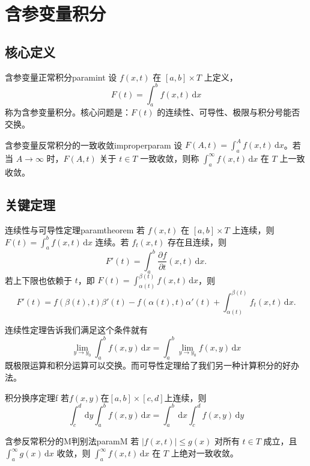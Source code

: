 \documentclass[UTF8,zihao=-4,openany]{ctexbook}
\newcommand{\dd}{\,\mathrm{d}}
\begin{document}
\chapter{含参变量积分}
\section{核心定义}
\begin{definition}{含参变量正常积分}{paramint}
设 $f(x,t)$ 在 $[a,b]\times T$ 上定义，
\[
F(t)=\int_a^b f(x,t)\dd x
\]
称为含参变量积分。核心问题是：$F(t)$ 的连续性、可导性、极限与积分号能否交换。
\end{definition}

\begin{definition}{含参变量反常积分的一致收敛}{improperparam}
设 $F(A,t)=\int_a^A f(x,t)\dd x$。若当 $A\to\infty$ 时，$F(A,t)$ 关于 $t\in T$ 一致收敛，则称 $\int_a^\infty f(x,t)\dd x$ 在 $T$ 上一致收敛。
\end{definition}

\section{关键定理}
\begin{theorem}{连续性与可导性定理}{paramtheorem}
若 $f(x,t)$ 在 $[a,b]\times T$ 上连续，则 $F(t)=\int_a^b f(x,t)\dd x$ 连续。若 $f_t(x,t)$ 存在且连续，则
\[
F'(t)=\int_a^b \frac{\partial f}{\partial t}(x,t)\dd x.
\]
若上下限也依赖于 $t$，即 $F(t)=\int_{\alpha(t)}^{\beta(t)}f(x,t)\dd x$，则
\[
F'(t)=f(\beta(t),t)\beta'(t)-f(\alpha(t),t)\alpha'(t)+\int_{\alpha(t)}^{\beta(t)}f_t(x,t)\dd x.
\]
\end{theorem}
连续性定理告诉我们满足这个条件就有\[
    \lim_{y\to y_0}\int_{a}^{b}f(x,y)\dd x=\int_{a}^{b}\lim_{y\to y_0}f(x,y)\dd x
\]既极限运算和积分运算可以交换。而可导性定理给了我们另一种计算积分的好办法。

\begin{theorem}{积分换序定理}{f}
    若\(f(x,y)\)在\([a,b] \times [c,d]\)上连续，则\[
        \int_{c}^{d}\dd y\int_{a}^{b}f(x,y)\dd x=\int_{a}^{b}\dd x\int_{c}^{d}f(x,y)\dd y
    \]
\end{theorem}






\begin{theorem}{含参反常积分的M判别法}{paramM}
若 $|f(x,t)|\le g(x)$ 对所有 $t\in T$ 成立，且 $\int_a^\infty g(x)\dd x$ 收敛，则 $\int_a^\infty f(x,t)\dd x$ 在 $T$ 上绝对一致收敛。
\end{theorem}
\end{document}
